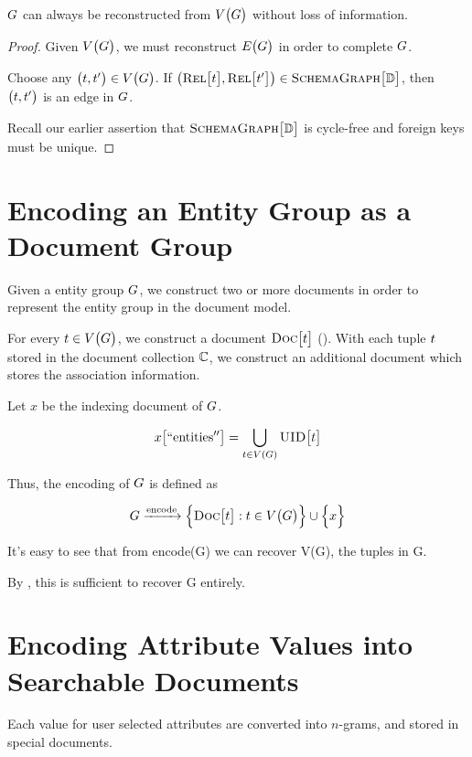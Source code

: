 		\begin{claim}
		\label{clm:lossless}
			$G$ can always be reconstructed from $V\bigl(G\bigr)$ without loss of information.
		\end{claim}
		
		\begin{proof}
			Given $V\bigl(G\bigr)$, we must reconstruct $E\bigl(G\bigr)$ in order to complete $G$.
			
			Choose any $\bigl(t, t'\bigr) \in V\bigl(G\bigr)$.	If $\bigl(\textsc{Rel}\bigl[t\bigr], \textsc{Rel}\bigl[t'\bigr]\bigr) \in \textsc{SchemaGraph}\bigl[\mathbb{D}\bigr]$, then $\bigl(t, t'\bigr)$ is an edge in $G$.
			
			Recall our earlier assertion that $\textsc{SchemaGraph}\bigl[\mathbb{D}\bigr]$ is cycle-free and foreign keys must be unique.
		\end{proof}
		
	\section{Encoding an Entity Group as a Document Group}
		Given a entity group $G$, we construct two or more documents in order to represent the entity group in the document model.
		
		For every $t \in V\bigl(G\bigr)$, we construct a document $\textsc{Doc}\bigl[t\bigr]$ ().  With each tuple $t$ stored in the document collection $\mathbb{C}$, we construct an additional document which stores the association information.
		
		Let $x$ be the indexing document of $G$.
		
		\[
			x\bigl[\mathrm{``entities''}\bigr] = \bigcup_{t \in V\left(G\right)} \textsc{UID}\bigl[t\bigr]
		\]
		
		Thus, the encoding of $G$ is defined as
		
		\[
			G \xrightarrow{\mathrm{encode}} \Bigl\{\textsc{Doc}\bigl[t\bigr] : t \in V\bigl(G\bigr)\Bigr\} \cup \Bigl\{x\Bigr\}
		\]
		
		It's easy to see that from encode(G) we can recover V(G), the tuples in G.
		
		By , this is sufficient to recover G entirely.
	
	\section{Encoding Attribute Values into Searchable Documents}
		Each value for user selected attributes are converted into $n$-grams, and stored in special documents.
	

